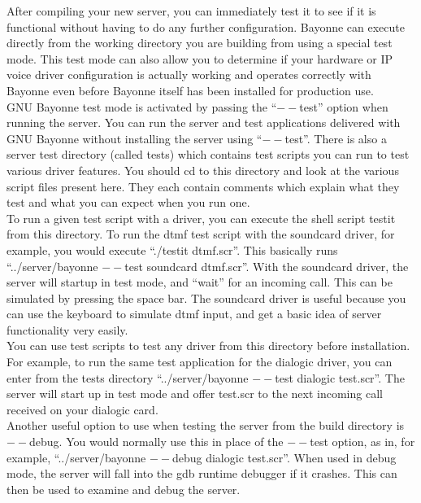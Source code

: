 \documentclass[a4paper,12pt]{article}
\begin{document}
After compiling your new server, you can immediately test it to see if it
is functional without having to do any further configuration.  Bayonne can
execute directly from the working directory you are building from using a
special test mode.  This test mode can also allow you to determine if your
hardware or IP voice driver configuration is actually working and operates
correctly with Bayonne even before Bayonne itself has been installed for
production use. \\

GNU Bayonne test mode is activated by passing the ``$--$test'' option
when running the server.  You can run the server and test applications
delivered with GNU Bayonne without installing the server using
``$--$test''.  There is also a server test directory (called tests)
which contains test scripts you can run to test various driver features. 
You should cd to this directory and look at the various script files
present here.  They each contain comments which explain what they test
and what you can expect when you run one. \\

To run a given test script with a driver, you can execute the shell
script testit from this directory.  To run the dtmf test script with the
soundcard driver, for example, you would execute ``./testit dtmf.scr''. 
This basically runs ``../server/bayonne $--$test soundcard dtmf.scr''. 
With the soundcard driver, the server will startup in test mode, and
``wait'' for an incoming call.  This can be simulated by pressing the
space bar.  The soundcard driver is useful because you can use the
keyboard to simulate dtmf input, and get a basic idea of server
functionality very easily. \\

You can use test scripts to test any driver from this directory before
installation.  For example, to run the same test application for the
dialogic driver, you can enter from the tests directory ``../server/bayonne
$--$test dialogic test.scr''.  The server will start up in test mode and
offer test.scr to the next incoming call received on your dialogic card. \\

Another useful option to use when testing the server from the build directory
is $--$debug.  You would normally use this in place of the $--$test option,
as in, for example, ``../server/bayonne $--$debug dialogic test.scr''.  When
used in debug mode, the server will fall into the gdb runtime debugger if
it crashes.  This can then be used to examine and debug the server. \\
\end{document}
